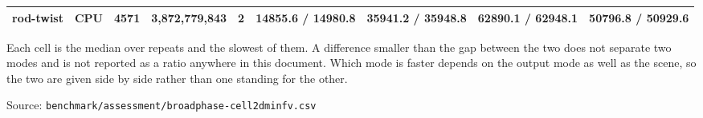 \begin{table}[htbp]
{\begin{tabular}{llrrrrrrr}
    rod-twist & CPU & 4571 & 3,872,779,843 & 2 & 14855.6 / 14980.8 & 35941.2 / 35948.8 & 62890.1 / 62948.1 & 50796.8 / 50929.6 \\
    \bottomrule
  \end{tabular}}
  \par\smallskip\footnotesize Each cell is the median over repeats and the slowest of them. A difference smaller than the gap between the two does not separate two modes and is not reported as a ratio anywhere in this document. Which mode is faster depends on the output mode as well as the scene, so the two are given side by side rather than one standing for the other.
  \par\smallskip\footnotesize Source: \texttt{benchmark/assessment/broadphase-cell2dminfv.csv}
\end{table}

